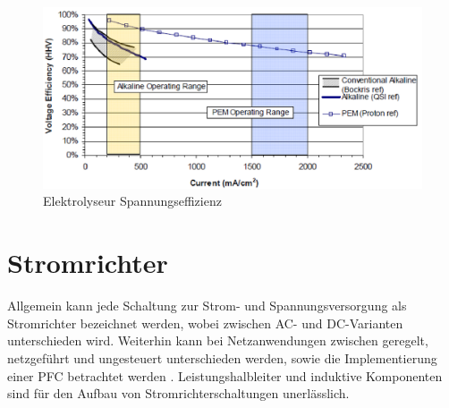 \begin{figure}
	\centering
	\includegraphics[width=0.9\linewidth]{content/Grafiken/Ely-Efficiency}
	\caption{Elektrolyseur Spannungseffizienz \cite{NOWH2}}
	\label{fig:ely-efficiency}
\end{figure}
\section{Stromrichter}
\label{sec:Stromrichter}
Allgemein kann jede Schaltung zur Strom- und Spannungsversorgung als Stromrichter bezeichnet werden, wobei zwischen AC- und DC-Varianten unterschieden wird. Weiterhin kann bei Netzanwendungen zwischen geregelt, netzgeführt und ungesteuert unterschieden werden, sowie die Implementierung einer \gls{PFC} betrachtet werden \cite{Schroder.2018}. Leistungshalbleiter und induktive Komponenten sind für den Aufbau von Stromrichterschaltungen unerlässlich. 
